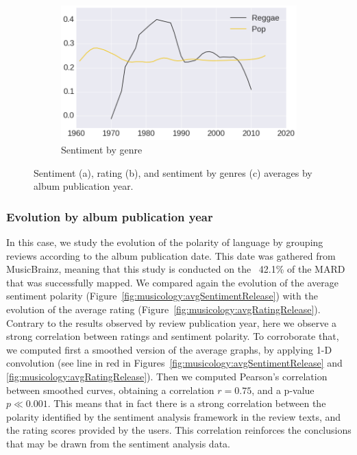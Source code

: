 \begin{figure}
    \begin{subfigure}{.49\textwidth}
        \centering
        \includegraphics[width=\columnwidth]{ch05_musicology_pics/genres_release_trend.png}
        \caption{Sentiment by genre}
        \label{fig:musicology:avgSentimentGenresRelease}
    \end{subfigure}
    \caption{Sentiment (a), rating (b), and sentiment by genres (c) averages by album publication year.}
\end{figure}

\subsubsection{Evolution by album publication year}
\label{sec:musicology:evolution-album}

In this case, we study the evolution of the polarity of language by grouping reviews according to the album publication date. This date was gathered from MusicBrainz, meaning that this study is conducted on the ~42.1\% of the MARD that was successfully mapped. We compared again the evolution of the average sentiment polarity (Figure~\ref{fig:musicology:avgSentimentRelease}) with the evolution of the average rating (Figure~\ref{fig:musicology:avgRatingRelease}). Contrary to the results observed by review publication year, here we observe a strong correlation between ratings and sentiment polarity. To corroborate that, we computed first a smoothed version of the average graphs, by applying 1-D convolution (see line in red in Figures~\ref{fig:musicology:avgSentimentRelease} and \ref{fig:musicology:avgRatingRelease}). Then we computed Pearson's correlation between smoothed curves, obtaining a correlation $r = 0.75$, and a p-value $p \ll 0.001$. This means that in fact there is a strong correlation between the polarity identified by the sentiment analysis framework in the review texts, and the rating scores provided by the users. This correlation reinforces the conclusions that may be drawn from the sentiment analysis data. %

